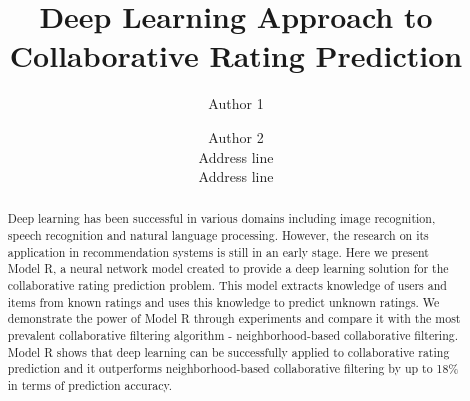 \documentclass[letterpaper]{article}
\title{Deep Learning Approach to Collaborative Rating Prediction}
\author{Author 1 \and Author 2\\
	Address line\\
	Address line\\
}
\begin{document}
\maketitle

\begin{abstract}
	Deep learning has been successful in various domains 
	including image recognition, speech recognition and natural language 
	processing.
	However, the research on its application in recommendation systems is 
	still in an early stage.
	Here we present Model R, a neural network model created to provide a deep 
	learning solution for the collaborative rating prediction problem.
	This model extracts knowledge of users and items from known ratings and 
	uses this knowledge to predict unknown ratings.
	We demonstrate the power of Model R through experiments and compare it with 
	the most prevalent collaborative filtering algorithm - neighborhood-based 
	collaborative filtering.
	Model R shows that deep learning can be successfully applied to 
	collaborative rating prediction and it outperforms neighborhood-based 
	collaborative filtering by up to 18\% in terms of prediction accuracy.
\end{abstract}
\end{document}
